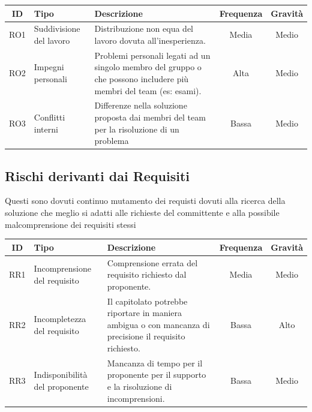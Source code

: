 \documentclass[a4paper, 12pt]{article}
\begin{document}
\begin{center}
    \begin{tabularx}{\textwidth}{||c|X|X|c|c||}
        \hline
        \textbf{ID} & \textbf{Tipo} & \textbf{Descrizione} & \textbf{Frequenza} & \textbf{Gravità} \\
        \hline \hline
        RO1 & Suddivisione del lavoro & Distribuzione non equa del lavoro dovuta all'inesperienza. & Media & Medio \\
        \hline
        RO2 & Impegni personali & Problemi personali legati ad un singolo membro del gruppo o che possono includere più membri del team (es: esami). & Alta & Medio \\
        \hline
        RO3 & Conflitti interni & Differenze nella soluzione proposta dai membri del team per la risoluzione di un problema & Bassa & Medio \\
        \hline \hline
    \end{tabularx}
\end{center}
    


\subsection{Rischi derivanti dai Requisiti}
Questi sono dovuti continuo mutamento dei requisti dovuti alla ricerca della soluzione che meglio si adatti alle richieste del committente e alla possibile malcomprensione dei requisiti stessi

\begin{center}
    \begin{tabularx}{\textwidth}{||c|X|X|c|c||}
        \hline
        \textbf{ID} & \textbf{Tipo} & \textbf{Descrizione} & \textbf{Frequenza} & \textbf{Gravità} \\
        \hline \hline
        RR1 & Incomprensione del requisito & Comprensione errata del requisito richiesto dal proponente. & Media & Medio \\
        \hline
        RR2 & Incompletezza del requisito & Il capitolato potrebbe riportare in maniera ambigua o con mancanza di precisione il requisito richiesto. & Bassa & Alto \\
        \hline 
        RR3 & Indisponibilità del proponente & Mancanza di tempo per il proponente per il supporto e la risoluzione di incomprensioni. & Bassa & Medio \\ 
        \hline \hline
    \end{tabularx}
\end{center}
\end{document}
